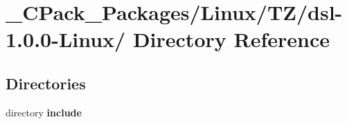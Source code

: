 \section{\_\-CPack\_\-Packages/Linux/TZ/dsl-\/1.0.0-\/Linux/ Directory Reference}
\label{dir_775e09240b0f2760919c1045e6729762}
\subsection*{Directories}
\begin{DoxyCompactItemize}
\item 
directory {\bf include}
\end{DoxyCompactItemize}
